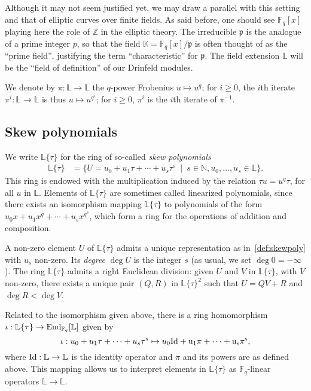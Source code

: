 \documentclass[sigconf]{acmart}
\newcommand{\K}{\mathbb{K}}
\newcommand{\F}{\mathbb{F}}
\newcommand{\Z}{\mathbb{Z}}
\newcommand{\N}{\mathbb{N}}
\renewcommand{\L}{\mathbb{L}}
\newcommand{\ang}[1]{\{#1\}}
\newcommand{\frakp}{\mathfrak{p}}
\begin{document}
Although it may not seem justified yet, we may draw a parallel with
this setting and that of elliptic curves over finite fields. As said
before, one should see $\F_q[x]$ playing here the role of $\Z$ in the
elliptic theory. The irreducible $\frakp$ is the analogue of a prime
integer $p$, so that the field $\K = \F_q[x]/\frakp$ is often thought
of as the ``prime field'', justifying the term ``characteristic'' for
$\frakp$. The field extension $\L$ will be the ``field of
definition'' of our Drinfeld modules.

We denote by $\pi: \L \to \L$ the $q$-power Frobenius $u \mapsto u^q$;
for $i \ge 0$, the $i$th iterate $\pi^i: \L \to \L$ is thus $u \mapsto
u^{q^i}$; for $i \ge 0$, $\pi^i$ is the $i$th iterate of $\pi^{-1}$.


\subsection{Skew polynomials}

We write $\L\ang{\tau}$ for the ring of so-called {\em skew
  polynomials}
\begin{align}\label{def:skewpoly}
\L\ang{\tau} &= \{U=u_0 + u_1 \tau + \cdots + u_s \tau^s \ \mid \ s \in
\N, u_0,\dots,u_s \in \L\}.
\end{align}
This ring is endowed with the multiplication induced by the relation
$\tau u = u^q \tau$, for all $u$ in $\L$.  Elements of $\L\ang{\tau}$
are sometimes called linearized polynomials, since there exists an
isomorphism mapping $\L\ang{\tau}$ to polynomials of the form $u_0x +
u_1 x^q + \cdots + u_s x^{q^s}$, which form a ring for the operations
of addition and composition. 

A non-zero element $U$ of $\L\ang{\tau}$ admits a unique
representation as in~\eqref{def:skewpoly} with $u_s$ non-zero. Its
{\em degree} $\deg U$ is the integer $s$ (as usual, we set $\deg 0
=-\infty$).  The ring $\L\ang{\tau}$ admits a right Euclidean
division: given $U$ and $V$ in $\L\ang{\tau}$, with $V$ non-zero,
there exists a unique pair $(Q,R)$ in $\L\ang{\tau}^2$ such that $U =
QV +R$ and $\deg R < \deg V$.

Related to the isomorphism given above, there is a ring homomorphism
$\iota:\L\ang{\tau} \to {\rm End}_{\F_q}[\L]$ given by
\[\iota: u_0 + u_1\tau + \dots
+ u_s\tau^s \mapsto u_0 \rm{Id} + u_1 \pi + \dots+ u_s \pi^s, \] where
$\rm{Id}: \L \to \L$ is the identity operator and $\pi$ and its powers
are as defined above. This mapping allows us to interpret elements in
$ \L\ang{\tau}$ as $\F_q$-linear operators $\L \to \L$.
\end{document}
